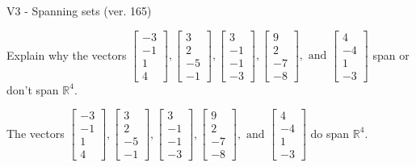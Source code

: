 \begin{exercise}
  \begin{exerciseTitle}V3 - Spanning sets (ver. 165)\end{exerciseTitle}
  \begin{exerciseStatement}
    Explain why the vectors \(\left[\begin{array}{r}
-3 \\
-1 \\
1 \\
4
\end{array}\right] , \left[\begin{array}{r}
3 \\
2 \\
-5 \\
-1
\end{array}\right] , \left[\begin{array}{r}
3 \\
-1 \\
-1 \\
-3
\end{array}\right] , \left[\begin{array}{r}
9 \\
2 \\
-7 \\
-8
\end{array}\right] , \text{ and } \left[\begin{array}{r}
4 \\
-4 \\
1 \\
-3
\end{array}\right]\) span or don't span \(\mathbb{R}^4\). 
	


  \end{exerciseStatement}
  \begin{exerciseAnswer}
   The vectors \(\left[\begin{array}{r}
-3 \\
-1 \\
1 \\
4
\end{array}\right] , \left[\begin{array}{r}
3 \\
2 \\
-5 \\
-1
\end{array}\right] , \left[\begin{array}{r}
3 \\
-1 \\
-1 \\
-3
\end{array}\right] , \left[\begin{array}{r}
9 \\
2 \\
-7 \\
-8
\end{array}\right] , \text{ and } \left[\begin{array}{r}
4 \\
-4 \\
1 \\
-3
\end{array}\right]\) 
  	 do  
	span \(\mathbb{R}^4\).
  



\end{exerciseAnswer}
\end{exercise}
